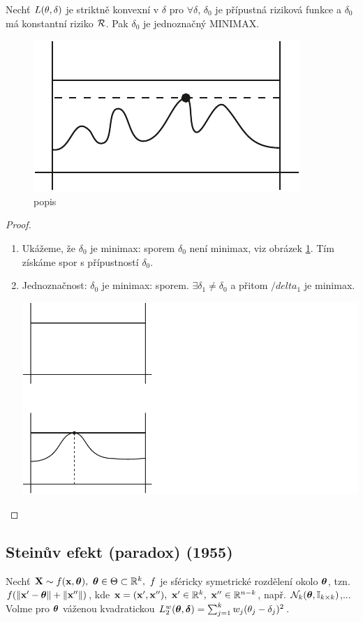 \begin{theorem}["Obrátka"]
	Nechť $L(\theta,\delta)$ je striktně konvexní v $\delta$ pro $\forall\delta$, $\delta_0$ je přípustná riziková funkce a $\delta_0$ má konstantní riziko $\mathcal{R}$. Pak $\delta_0$ je jednoznačný MINIMAX.
	\begin{figure}[h]
		\centering
		\includegraphics[width=0.4\linewidth]{pictures/26_11_3.pdf}
		\caption{popis}
		\label{fig:26-3}
	\end{figure}
	
	\begin{proof}
		\begin{enumerate}[1)]
			\item Ukážeme, že $\delta_0$ je minimax: sporem $\delta_0$ není minimax, viz obrázek \ref{fig:26-3}. Tím získáme spor s přípustností $\delta_0$.
			\item Jednoznačnost: $\delta_0$ je minimax: sporem. $\exists\delta_1\neq\delta_0$ a přitom $/delta_1$ je minimax.
			\begin{center}
				\includegraphics[width=0.7\linewidth]{pictures/26_11_4.pdf}
			\end{center}
		\end{enumerate}
	\end{proof}
\end{theorem}
\subsection{Steinův efekt (paradox) (1955)}
Nechť $\textbf{X}\sim f(\textbf{x},\boldsymbol{\theta}),~\boldsymbol{\theta}\in\Theta\subset\mathbb{R}^k,~f$ je sféricky symetrické rozdělení okolo $\boldsymbol{\theta}$, tzn. $f(\left\|\textbf{x}'-\boldsymbol{\theta}\right\|+\left\|\textbf{x}''\right\|)$, kde $\textbf{x}=(\textbf{x}',\textbf{x}''),~\textbf{x}'\in\mathbb{R}^k,~\textbf{x}''\in\mathbb{R}^{n-k}$, např. $\mathcal{N}_k(\boldsymbol{\theta},\mathbb{I}_{k\times k})$,... Volme pro $\boldsymbol{\theta}$ váženou kvadratickou $L_2^w(\boldsymbol{\theta},\boldsymbol{\delta})=\sum_{j=1}^k w_j(\theta_j-\delta_j)^2$. 
	

